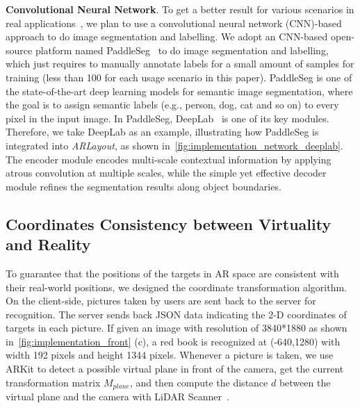 \textbf{Convolutional Neural Network}.
To get a better result for various scenarios in real applications~\cite{Zhu2020},
we plan to use a convolutional neural network (CNN)-based approach
to do image segmentation and labelling.
We adopt an CNN-based open-source platform named PaddleSeg~\cite{Liu2019,Liu2021a}
to do image segmentation and labelling,
which just requires to manually annotate labels for a small amount of
samples for training (less than 100 for each usage scenario in this paper).
PaddleSeg is one of the state-of-the-art deep learning models for semantic image segmentation,
where the goal is to assign semantic labels (e.g., person, dog, cat and so on)
to every pixel in the input image.
In PaddleSeg, DeepLab~\cite{Chen2018} is one of its key modules.
Therefore, we take DeepLab as an example,
illustrating how PaddleSeg is integrated into \textit{ARLayout},
as shown in~\autoref{fig:implementation_network_deeplab}.
The encoder module encodes multi-scale contextual information by
applying atrous convolution at multiple scales, while the simple yet effective decoder
module refines the segmentation results along object boundaries.



\subsection{Coordinates Consistency between Virtuality and Reality}

To guarantee that the positions of the targets in AR space are consistent with their real-world positions,
we designed the coordinate transformation algorithm.
On the client-side, pictures taken by users are sent back to
the server for recognition.
The server sends back JSON data indicating the 2-D coordinates of targets in each picture.
If given an image with resolution of 3840*1880 as shown in~\autoref{fig:implementation_front} (c),
a red book is recognized at (-640,1280) with width 192 pixels and height 1344 pixels.
Whenever a picture is taken, we use ARKit to detect a possible virtual plane
in front of the camera, get the current transformation matrix $M_{plane}$,
and then compute the distance $d$ between the virtual plane and the
camera with LiDAR Scanner~\cite{ARKit}.



